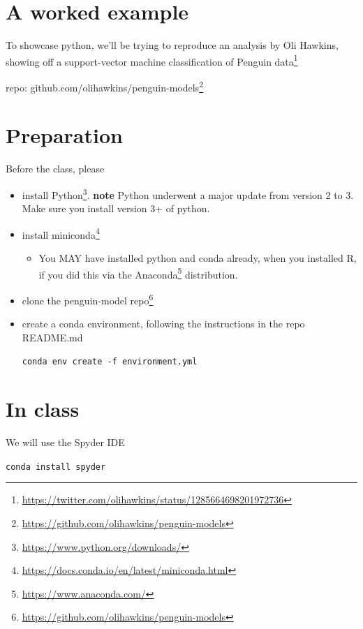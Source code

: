\documentclass[
  12pt,
  a5paper,
]{book}
\DeclareRobustCommand{\href}[2]{#2\footnote{\url{#1}}}
\providecommand{\tightlist}{%
  \setlength{\itemsep}{0pt}\setlength{\parskip}{0pt}}
\begin{document}
\hypertarget{a-worked-example}{%
\section{A worked example}\label{a-worked-example}}

To showcase python, we'll be trying to reproduce an analysis by Oli Hawkins, showing off a \href{https://twitter.com/olihawkins/status/1285664698201972736}{support-vector machine classification of Penguin data}

repo: \href{https://github.com/olihawkins/penguin-models}{github.com/olihawkins/penguin-models}

\hypertarget{preparation}{%
\section{Preparation}\label{preparation}}

Before the class, please

\begin{itemize}
\item
  install \href{https://www.python.org/downloads/}{Python}. \textbf{note} Python underwent a major update from version 2 to 3. Make sure you install version 3+ of python.
\item
  install \href{https://docs.conda.io/en/latest/miniconda.html}{miniconda}

  \begin{itemize}
  \tightlist
  \item
    You MAY have installed python and conda already, when you installed R, if you did this via the \href{https://www.anaconda.com/}{Anaconda} distribution.
  \end{itemize}
\item
  clone \href{https://github.com/olihawkins/penguin-models}{the penguin-model repo}
\item
  create a conda environment, following the instructions in the repo README.md

  \texttt{conda\ env\ create\ -f\ environment.yml}
\end{itemize}

\hypertarget{in-class}{%
\section{In class}\label{in-class}}

We will use the Spyder IDE

\texttt{conda\ install\ spyder}
\end{document}
